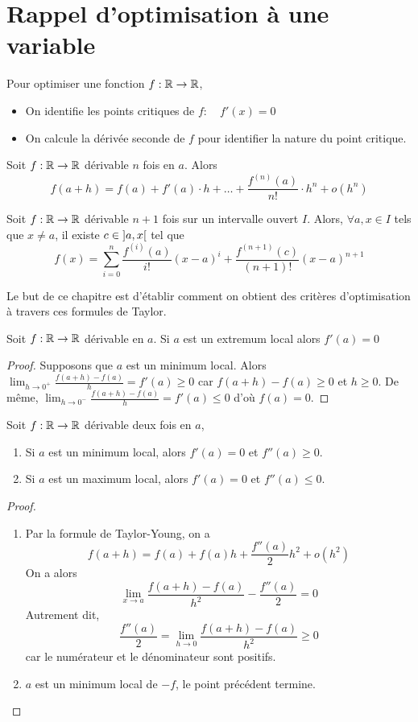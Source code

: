 \chapter{Rappel d'optimisation à une variable}
Pour optimiser une fonction $f:\mathbb{R}\to \mathbb{R}$,
\begin{itemize}
    \item On identifie les points critiques de $f:\quad f'(x)=0$
    \item On calcule la dérivée seconde de $f$ pour identifier la nature du point critique.
\end{itemize}
\begin{theoreme}
    Soit $f:\mathbb{R}\to\mathbb{R}$ dérivable $n$ fois en $a$. Alors 
    \begin{equation*}
        f(a+h)=f(a)+f'(a)\cdot h+\dots + \frac{f^{(n)}(a)}{n!}\cdot h^n+o(h^n)
    \end{equation*}
\end{theoreme}
\begin{theoreme}
    Soit $f:\mathbb{R}\to\mathbb{R}$ dérivable $n+1$ fois sur un intervalle ouvert $I$. Alors, $\forall a, x \in I$ tels que $x\ne a$, il existe $c\in\left] a,x\right[$ tel que $$f(x) = \sum_{i=0}^n\frac{f^{(i)}(a)}{i!}(x-a)^i+\frac{f^{(n+1)}(c)}{(n+1)!}(x-a)^{n+1}$$
\end{theoreme}
Le but de ce chapitre est d'établir comment on obtient des critères d'optimisation à travers ces formules de Taylor.
\begin{proposition}
    Soit $f:\mathbb{R}\to\mathbb{R}$ dérivable en $a$. Si $a$ est un extremum local alors $f'(a)=0$
\end{proposition}
\begin{proof}
    Supposons que $a$ est un minimum local. Alors $\lim_{h\to0^+}\frac{f(a+h)-f(a)}{h} = f'(a)\ge 0$ car $f(a+h)-f(a)\ge 0$ et $h\ge 0$. De même, $\lim_{h\to0^-}\frac{f(a+h)-f(a)}{h} = f'(a)\le 0$ d'où $f(a) = 0$.
\end{proof}
\begin{proposition}
    Soit $f:\mathbb{R}\to\mathbb{R}$ dérivable deux fois en $a$,
    \begin{enumerate}
        \item Si $a$ est un minimum local, alors $f'(a)=0$ et $f''(a)\geq 0$.
        \item Si $a$ est un maximum local, alors $f'(a)=0$ et $f''(a)\le 0$.
    \end{enumerate}
\end{proposition}
\begin{proof}
    \begin{enumerate}
        \item Par la formule de Taylor-Young, on a $$f(a+h) = f(a)+f(a)h+\frac{f''(a)}{2}h^2+o(h^2)$$ On a alors $$\lim_{x\to a}\frac{f(a+h)-f(a)}{h^2}-\frac{f''(a)}{2}=0$$ Autrement dit, $$\frac{f''(a)}{2}=\lim_{h\to 0}\frac{f(a+h)-f(a)}{h^2}\ge 0$$ car le numérateur et le dénominateur sont positifs.
        \item $a$ est un minimum local de $-f$, le point précédent termine.
    \end{enumerate}
\end{proof}
